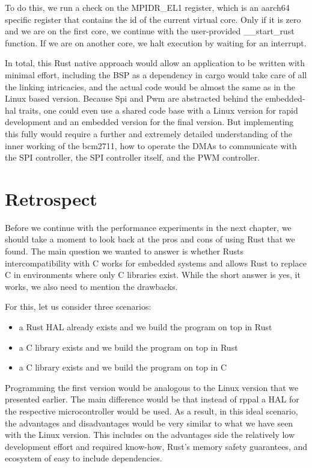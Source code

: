 To do this, we run a check on the MPIDR\_EL1 register, which is an aarch64 specific register that contains the id of the current virtual core.
Only if it is zero and we are on the first core, we continue with the user-provided \_\_start\_rust function.
If we are on another core, we halt execution by waiting for an interrupt.



In total, this Rust native approach would allow an application to be written with minimal effort,
including the BSP as a dependency in cargo would take care of all the linking intricacies,
and the actual code would be almost the same as in the Linux based version.
Because Spi and Pwm are abstracted behind the embedded-hal traits, one could even use a shared code base with a Linux version for rapid development
and an embedded version for the final version.
But implementing this fully would require a further and extremely detailed understanding of the inner working of the bcm2711,
how to operate the DMAs to communicate with the SPI controller, the SPI controller itself, and the PWM controller.

\section{Retrospect}

Before we continue with the performance experiments in the next chapter, we should take a moment to look back at the pros and cons of using Rust that we found.
The main question we wanted to answer is whether Rusts intercompatibility with C works for embedded systems and allows Rust to replace C in environments where only C libraries exist.
While the short answer is yes, it works, we also need to mention the drawbacks.

For this, let us consider three scenarios:
\begin{itemize}
    \item a Rust HAL already exists and we build the program on top in Rust
    \item a C library exists and we build the program on top in Rust
    \item a C library exists and we build the program on top in C
\end{itemize}

Programming the first version would be analogous to the Linux version that we presented earlier.
The main difference would be that instead of rppal a HAL for the respective microcontroller would be used.
As a result, in this ideal scenario, the advantages and disadvantages would be very similar to what we have seen with the Linux version.
This includes on the advantages side the relatively low development effort and required know-how, Rust's memory safety guarantees, and ecosystem of easy to include dependencies.


